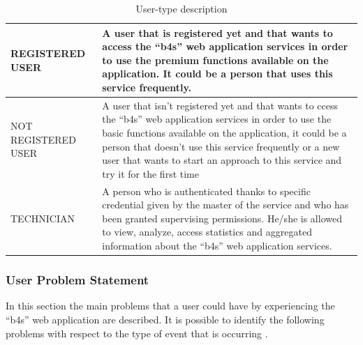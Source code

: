 \documentclass{article}
\begin{document}
\begin{table} [H]
    \begin{center}
        \begin{tabular}{|p{}|p{}|}
            \hline
            REGISTERED USER &   A user that is registered yet and that wants to access the “b4s” web application services in order to use the premium functions available  on  the application. It  could  be  a  person  that  uses this service frequently. \\ 
            \hline
            NOT REGISTERED USER &  
            A user  that  isn’t registered  yet  and  that  wants to ccess  the  “b4s”  web application  services  in  order  to  use the  basic functions available on the application, it could be a person that doesn’t use this service frequently or a new user that wants to start an approach to this service and try it for the first time  \\
            \hline
            TECHNICIAN &  
            A person who is authenticated thanks to specific credential given by the master of the service and who has been granted supervising permissions.   He/she  is  allowed  to  view,  analyze,  access  statistics  and aggregated information about the “b4s” web application services.
            \\
            \hline
        \end{tabular}
    \end{center}
\caption{User-type description}
\end{table}

\subsubsection{User Problem Statement}
In this section the main problems that a user could have by experiencing the “b4s” web application are described.
It is possible to identify the following problems with respect to the type of event that is occurring .
\end{document}
